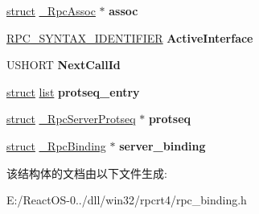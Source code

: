 \begin{DoxyCompactItemize}
\item 
\mbox{\label{struct___rpc_connection_a0418bfa8c213629fbbd03edff30452b5}} 
\hyperlink{interfacestruct}{struct} \hyperlink{struct___rpc_assoc}{\+\_\+\+Rpc\+Assoc} $\ast$ {\bfseries assoc}
\item 
\mbox{\label{struct___rpc_connection_a5c0b4c30953298450d097caa60e25e77}} 
\hyperlink{struct___r_p_c___s_y_n_t_a_x___i_d_e_n_t_i_f_i_e_r}{R\+P\+C\+\_\+\+S\+Y\+N\+T\+A\+X\+\_\+\+I\+D\+E\+N\+T\+I\+F\+I\+ER} {\bfseries Active\+Interface}
\item 
\mbox{\label{struct___rpc_connection_a33ab17f6f43f6ce8e771c1776ac9d30b}} 
U\+S\+H\+O\+RT {\bfseries Next\+Call\+Id}
\item 
\mbox{\label{struct___rpc_connection_ac67413965e3f413725fc6d34bc62ff85}} 
\hyperlink{interfacestruct}{struct} \hyperlink{classlist}{list} {\bfseries protseq\+\_\+entry}
\item 
\mbox{\label{struct___rpc_connection_ad18d681e210cb1af38f058fb287a0f82}} 
\hyperlink{interfacestruct}{struct} \hyperlink{struct___rpc_server_protseq}{\+\_\+\+Rpc\+Server\+Protseq} $\ast$ {\bfseries protseq}
\item 
\mbox{\label{struct___rpc_connection_a6beb9f0156f038a319c0755452db53d2}} 
\hyperlink{interfacestruct}{struct} \hyperlink{struct___rpc_binding}{\+\_\+\+Rpc\+Binding} $\ast$ {\bfseries server\+\_\+binding}
\end{DoxyCompactItemize}


该结构体的文档由以下文件生成\+:\begin{DoxyCompactItemize}
\item 
E\+:/\+React\+O\+S-\/0../dll/win32/rpcrt4/rpc\+\_\+binding.\+h\end{DoxyCompactItemize}
